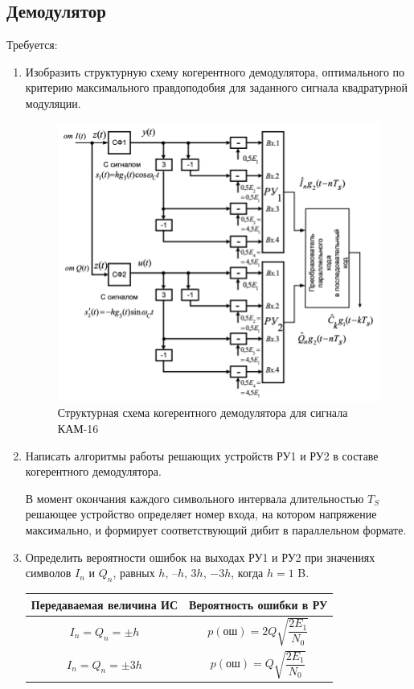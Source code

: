 \documentclass[a4paper, 12pt]{article}
\begin{document}
\subsection{Демодулятор}
Требуется:
\begin{enumerate}
  \item Изобразить структурную схему когерентного демодулятора, 
  оптимального по критерию максимального правдоподобия для заданного 
  сигнала квадратурной модуляции.
  \begin{figure}[H]
    \centering
    \includegraphics{demodulator}
    \caption{Структурная схема когерентного демодулятора 
    для сигнала КАМ-16}
  \end{figure}

  \item Написать алгоритмы работы решающих устройств РУ1 и РУ2 в 
  составе когерентного демодулятора.

  В момент окончания каждого символьного интервала длительностью 
  $T_S$ решающее устройство определяет номер входа, на котором 
  напряжение максимально, и формирует соответствующий дибит в 
  параллельном формате.

  \item Определить вероятности ошибок на выходах РУ1 и РУ2 при 
  значениях символов $I_n$ и $Q_n$, равных $h$, $–h$,
  $3h$, $-3h$, когда $h=1$ B.

  \begin{center}
    \begin{tabular}{ | c | c | }
      \hline
      Передаваемая величина ИС&Вероятность ошибки в РУ\\
      \hline
      $I_n=Q_n=\pm h$&$p(ош)=2Q\sqrt{\dfrac{2E_1}{N_0}}$\\
      \hline
      $I_n=Q_n=\pm 3h$&$p(ош)=Q\sqrt{\dfrac{2E_1}{N_0}}$\\
      \hline
    \end{tabular}
  \end{center}


\end{enumerate}
\end{document}
